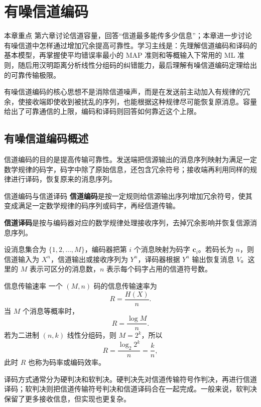 \section{有噪信道编码}

\begin{remarkBox}{本章重点}
第六章讨论信道容量，回答“信道最多能传多少信息”；本章进一步讨论有噪信道中怎样通过增加冗余提高可靠性。学习主线是：先理解信道编码和译码的基本模型，再掌握使平均错误率最小的 MAP 准则和等概输入下常用的 ML 准则，随后用汉明距离分析线性分组码的纠错能力，最后理解有噪信道编码定理给出的可靠传输极限。
\end{remarkBox}

有噪信道编码的核心思想不是消除信道噪声，而是在发送前主动加入有规律的冗余，使接收端即使收到被扰乱的序列，也能根据这种规律尽可能恢复原消息。容量给出了可靠通信的上限，编码和译码则回答如何靠近这个上限。

\subsection{有噪信道编码概述}

信道编码的目的是提高传输可靠性。发送端把信源输出的消息序列映射为满足一定数学规律的码字，码字中除了原始信息，还包含冗余符号；接收端再利用同样的规律进行译码，恢复原来的消息序列。

\begin{definitionBox}{信道编码与信道译码}
\textbf{信道编码}是按一定规则给信源输出序列增加冗余符号，使其变成满足一定数学规律的码序列或码字，再经信道传输。

\textbf{信道译码}是按与编码器对应的数学规律处理接收序列，去掉冗余影响并恢复信源消息序列。
\end{definitionBox}

设消息集合为 $\{1,2,\dots,M\}$，编码器把第 $i$ 个消息映射为码字 $\mathbf{c}_i$。若码长为 $n$，则信道输入为 $X^n$，信道输出或接收序列为 $Y^n$，译码器根据 $Y^n$ 输出恢复消息 $V$。这里的 $M$ 表示可区分的消息数，$n$ 表示每个码字占用的信道符号数。

\begin{formulaBox}{信息传输速率}
一个 $(M,n)$ 码的信息传输速率为
\[
R=\frac{H(X)}{n}.
\]
当 $M$ 个消息等概率时，
\[
R=\frac{\log M}{n}.
\]
若为二进制 $(n,k)$ 线性分组码，则 $M=2^k$，所以
\[
R=\frac{\log_2 2^k}{n}=\frac{k}{n},
\]
此时 $R$ 也称为码率或编码效率。
\end{formulaBox}

译码方式通常分为硬判决和软判决。硬判决先对信道传输符号作判决，再进行信道译码；软判决则把信道传输符号判决和信道译码合在一起完成。一般来说，软判决保留了更多接收信息，但实现也更复杂。

